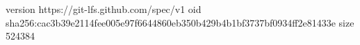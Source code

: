 version https://git-lfs.github.com/spec/v1
oid sha256:cac3b39e2114fee005e97f6644860eb350b429b4b1bf3737bf0934ff2e81433e
size 524384
